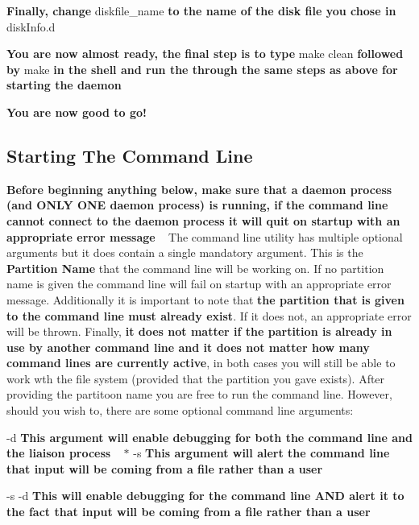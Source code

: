 \begin{DoxyEnumerate}
\begin{DoxyItemize}
\begin{DoxyItemize}
\end{DoxyItemize}
\item {\bfseries Finally, change} {\ttfamily diskfile\+\_\+name} {\bfseries to the name of the disk file you chose in} {\ttfamily disk\+Info.\+d}
\end{DoxyItemize}
\item {\bfseries You are now almost ready, the final step is to type} {\ttfamily make clean} {\bfseries followed by} {\ttfamily make} {\bfseries in the shell and run the through the same steps as above for starting the daemon}
\item {\bfseries You are now good to go!}
\end{DoxyEnumerate}

\subsection*{Starting The Command Line}

{\bfseries Before beginning anything below, make sure that a daemon process (and O\+N\+LY O\+NE daemon process) is running, if the command line cannot connect to the daemon process it will quit on startup with an appropriate error message} ~\newline
 The command line utility has multiple optional arguments but it does contain a single mandatory argument. This is the {\bfseries Partition Name} that the command line will be working on. If no partition name is given the command line will fail on startup with an appropriate error message. Additionally it is important to note that {\bfseries the partition that is given to the command line must already exist}. If it does not, an appropriate error will be thrown. Finally, {\bfseries it does not matter if the partition is already in use by another command line and it does not matter how many command lines are currently active}, in both cases you will still be able to work wth the file system (provided that the partition you gave exists). After providing the partitoon name you are free to run the command line. However, should you wish to, there are some optional command line arguments\+: ~\newline

\begin{DoxyItemize}
\item {\ttfamily -\/d} {\bfseries This argument will enable debugging for both the command line and the liaison process} ~\newline
$\ast$ {\ttfamily -\/s} {\bfseries This argument will alert the command line that input will be coming from a file rather than a user}
\item {\ttfamily -\/s -\/d} {\bfseries This will enable debugging for the command line A\+ND alert it to the fact that input will be coming from a file rather than a user}
\end{DoxyItemize}

